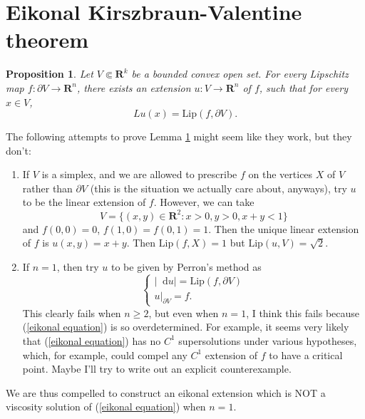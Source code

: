 \documentclass[reqno,11pt]{amsart}
\newcommand{\RR}{\mathbf{R}}
\newcommand*\dif{\mathop{}\!\mathrm{d}}
\DeclareMathOperator{\dist}{dist}
\newcommand{\Lip}{\mathrm{Lip}}
\newtheorem{proposition}[theorem]{Proposition}
\theoremstyle{definition}
\numberwithin{equation}{section}
\newcommand\todo[1]{\textcolor{red}{TODO: #1}}
\begin{document}



\section{Eikonal Kirszbraun-Valentine theorem}
\begin{proposition}\label{eikonal extension}
Let $V \Subset \RR^k$ be a bounded convex open set.
For every Lipschitz map $f: \partial V \to \RR^n$, there exists an extension $u: V \to \RR^n$ of $f$, such that for every $x \in V$,
$$Lu(x) = \Lip(f, \partial V).$$
\end{proposition}

The following attempts to prove Lemma \ref{eikonal extension} might seem like they work, but they don't:
\begin{enumerate}
\item If $V$ is a simplex, and we are allowed to prescribe $f$ on the vertices $X$ of $V$ rather than $\partial V$ (this is the situation we actually care about, anyways), try $u$ to be the linear extension of $f$.
However, we can take
$$V = \{(x, y) \in \RR^2: x > 0, y > 0, x + y < 1\}$$
and $f(0, 0) = 0$, $f(1, 0) = f(0, 1) = 1$.
Then the unique linear extension of $f$ is $u(x, y) = x + y$.
Then $\Lip(f, X) = 1$ but $\Lip(u, V) = \sqrt 2$.
\item If $n = 1$, then try $u$ to be given by Perron's method as
\begin{equation}\label{eikonal equation}
\begin{cases}
|\dif u| = \Lip(f, \partial V) \\
u|_{\partial V} = f.
\end{cases}
\end{equation}
This clearly fails when $n \geq 2$, but even when $n = 1$, I think this fails because (\ref{eikonal equation}) is so overdetermined.
For example, it seems very likely that (\ref{eikonal equation}) has no $C^1$ supersolutions under various hypotheses, which, for example, could compel any $C^1$ extension of $f$ to have a critical point.
Maybe I'll try to write out an explicit counterexample.
\end{enumerate}
We are thus compelled to construct an eikonal extension which is NOT a viscosity solution of (\ref{eikonal equation}) when $n = 1$.
\end{document}

